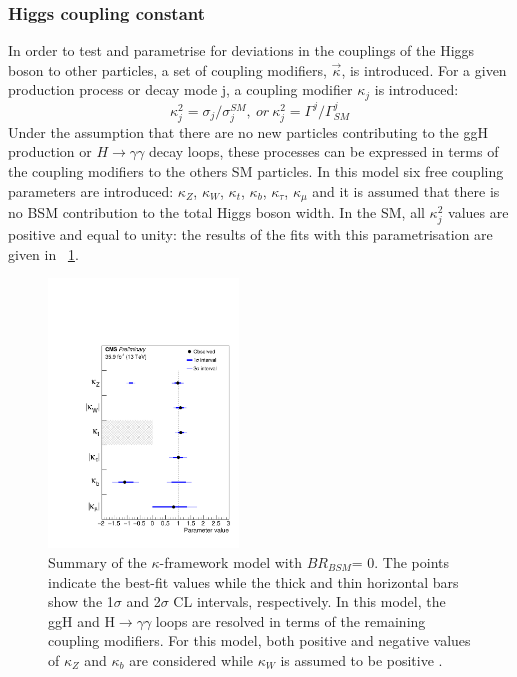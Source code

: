 \subsubsection{Higgs coupling constant}
In order to test and parametrise for deviations in the couplings of the Higgs boson to other particles, a set of coupling modifiers, $\vec{\kappa}$, is introduced. For a given production process or decay mode j, a coupling modifier $\kappa_j$ is introduced:
\[
\kappa^2_j = \sigma_j/\sigma^{SM}_j,\ or\ \kappa^2_j = \Gamma^j/\Gamma_{SM}^j
\]
Under the assumption that there are no new particles contributing to the ggH production or $H\to \gamma\gamma$ decay loops, these processes can be expressed in terms of the coupling modifiers to the others SM particles. In this model six free coupling parameters are introduced: $\kappa_Z$, $\kappa_W$, $\kappa_t$, $\kappa_b$, $\kappa_\tau$, $\kappa_\mu$ and it is assumed that there is no BSM contribution to the total Higgs boson width. In the SM, all $\kappa^2_j$ values are positive and equal to unity: the results of the fits with this parametrisation are given in \figurename~\ref{Hkappa}.
\begin{figure}[htbp]
\centering
\includegraphics[width=0.45\textwidth]{Images/Hkappa}
\caption{Summary of the $\kappa$-framework model with $BR_{BSM} $= 0. The points indicate the best-fit values while the thick and thin horizontal bars show the 1$\sigma$ and 2$\sigma$ CL intervals, respectively. In this model, the ggH and H$\to\gamma\gamma$ loops are resolved in terms of the remaining coupling modifiers. For this model, both positive and negative values of $\kappa_Z$ and $\kappa_b$ are considered while $\kappa_W$ is assumed to be positive \cite{LatestHiggsCMS}.}
\label{Hkappa}
\end{figure}
